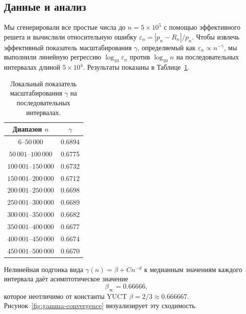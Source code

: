 \documentclass[12pt,a4paper]{article}
\begin{document}
	\subsection{Данные и анализ}
	Мы сгенерировали все простые числа до \(n = 5\times10^5\) с помощью эффективного решета и вычислили относительную ошибку \(\varepsilon_n = |p_n - R_n|/p_n\). Чтобы извлечь эффективный показатель масштабирования \(\gamma\), определяемый как \(\varepsilon_n \propto n^{-\gamma}\), мы выполнили линейную регрессию \(\log_{10}\varepsilon_n\) против \(\log_{10}n\) на последовательных интервалах длиной \(5\times10^4\). Результаты показаны в Таблице~\ref{tab:gamma}.
	
	\begin{table}[htbp]
		\centering
		\caption{Локальный показатель масштабирования \(\gamma\) на последовательных интервалах.}
		\label{tab:gamma}
		\small
		\begin{tabular}{c c}
			\toprule
			Диапазон \(n\) & \(\gamma\) \\
			\midrule
			\(6\)--\(50\,000\)    & 0.6894 \\
			\(50\,001\)--\(100\,000\) & 0.6775 \\
			\(100\,001\)--\(150\,000\)& 0.6732 \\
			\(150\,001\)--\(200\,000\)& 0.6712 \\
			\(200\,001\)--\(250\,000\)& 0.6698 \\
			\(250\,001\)--\(300\,000\)& 0.6689 \\
			\(300\,001\)--\(350\,000\)& 0.6682 \\
			\(350\,001\)--\(400\,000\)& 0.6677 \\
			\(400\,001\)--\(450\,000\)& 0.6674 \\
			\(450\,001\)--\(500\,000\)& 0.6670 \\
			\bottomrule
		\end{tabular}
	\end{table}
	
	Нелинейная подгонка вида \(\gamma(n) = \beta + C n^{-d}\) к медианным значениям каждого интервала даёт асимптотическое значение
	\[
	\beta_{\infty} = 0.66666,
	\]
	которое неотличимо от константы YUCT \(\beta = 2/3 \approx 0.666667\). Рисунок~\ref{fig:gamma-convergence} визуализирует эту сходимость.
	
\end{document}
